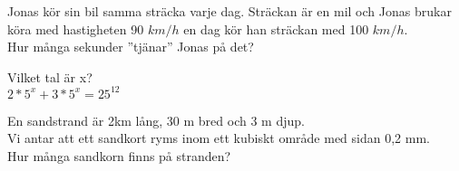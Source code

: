 \begin{displayquote}
\textcolor{turkos}{Jonas kör sin bil samma sträcka varje dag. Sträckan är en mil och Jonas brukar köra med hastigheten 90 $km/h$ en dag kör han sträckan med 100 $km/h$. \\
Hur många sekunder ''tjänar'' Jonas på det?}
\end{displayquote}



\begin{displayquote}
\textcolor{turkos}{Vilket tal är x?\\
\( 2*5^x + 3*5^x = 25^{12} \)}
\end{displayquote}


\begin{displayquote}
\textcolor{turkos}{En sandstrand är 2km lång, 30 m bred och 3 m djup. \\
Vi antar att ett sandkort ryms inom ett kubiskt område med sidan 0,2 mm.\\
Hur många sandkorn finns på stranden?}
\end{displayquote}


